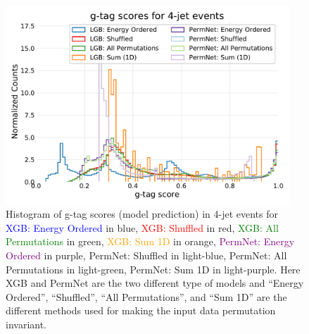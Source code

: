 \documentclass[a4paper, twoside, nobib]{tufte-book}
\newcommand{\q}[1]{``#1''}
\begin{document}
\begin{figure}
  \includegraphics[width=0.95\textwidth, trim=10 10 10 40, clip]{figures/quarks/gtag_y_pred_4_jet_hist-down_sample=1.00-ML_vars=vertex-selection=b-ejet_min=4-n_iter_RS_lgb=99-n_iter_RS_xgb=9-cdot_cut=0.90-version=19.pdf}
  \caption[g-tag scores in 4-jet events]
          {
            Histogram of g-tag scores (model prediction) in 4-jet events for \textcolor{blue}{XGB: Energy Ordered} in blue, \textcolor{red}{XGB: Shuffled} in red, \textcolor{green}{XGB: All Permutations} in green, \textcolor{orange}{XGB: Sum 1D} in orange, \textcolor{purple}{PermNet: Energy Ordered} in purple, \textcolor{light-blue}{PermNet: Shuffled} in light-blue, \textcolor{light-green}{PermNet: All Permutations} in light-green, \textcolor{light-purple}{PermNet: Sum 1D} in light-purple.  Here XGB and PermNet are the two different type of models and \q{Energy Ordered}, \q{Shuffled}, \q{All Permutations}, and \q{Sum 1D} are the different methods used for making the input data permutation invariant.  
          }   
  \label{fig:q:gtag_scores_4j}
\end{figure}
\end{document}
